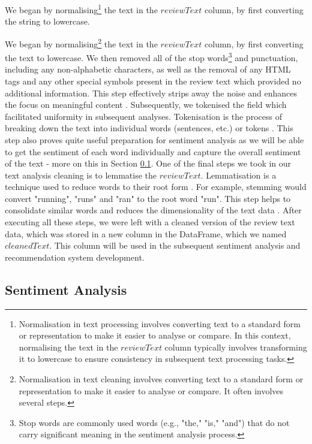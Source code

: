 We began by normalising\footnote{Normalisation in text processing involves converting text to a standard form or representation to make it easier to analyse or compare. In this context, normalising the text in the $reviewText$ column typically involves transforming it to lowercase to ensure consistency in subsequent text processing tasks.} the text in the $reviewText$ column, by first converting the string to lowercase.

We began by normalising\footnote{Normalisation in text cleaning involves converting text to a standard form or representation to make it easier to analyse or compare. It often involves several steps.} the text in the $reviewText$ column, by first converting the text to lowercase. We then removed all of the stop words\footnote{Stop words are commonly used words (e.g., "the," "is," "and") that do not carry significant meaning in the sentiment analysis process.} and punctuation, including any non-alphabetic characters, as well as the removal of any HTML tags and any other special symbols present in the review text which provided no additional information. This step effectively strips away the noise and enhances the focus on meaningful content \cite{saravanan2003summarization}. Subsequently, we tokenised the field which facilitated uniformity in subsequent analyses. Tokenisation is the process of breaking down the text into individual words (sentences, etc.) or tokens \cite{saravanan2003summarization}. This step also proves quite useful preparation for sentiment analysis as we will be able to get the sentiment of each word individually and capture the overall sentiment of the text - more on this in Section \ref{subsec:3 Sentiment Analysis}. One of the final steps we took in our text analysis cleaning is to lemmatise the $reviewText$. Lemmatisation is a technique used to reduce words to their root form \cite{saravanan2003summarization}. For example, stemming would convert "running", "runs" and "ran" to the root word "run". This step helps to consolidate similar words and reduces the dimensionality of the text data \cite{gharatkar2017review}. After executing all these steps, we were left with a cleaned version of the review text data, which was  stored in a new column in the DataFrame, which we named $cleanedText$. This column will be used in the subsequent sentiment analysis and recommendation system development.


\subsection{Sentiment Analysis}
\label{subsec:3 Sentiment Analysis}

